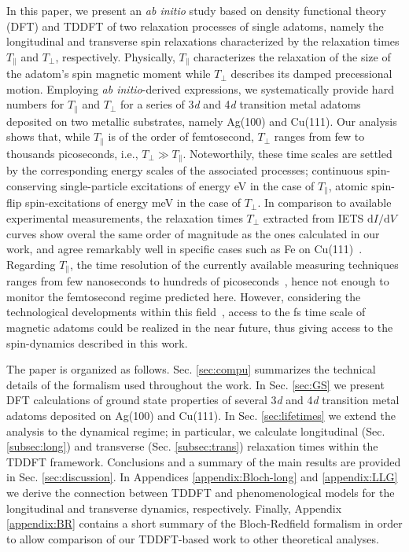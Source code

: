 \documentclass[prb,footinbib,showpacs,twocolumn,amsmath,amssymb]{revtex4}
\begin{document}
In this paper,
we present an \textit{ab initio} study based on density functional theory (DFT) and TDDFT 
of two relaxation processes of
single adatoms, namely the longitudinal and transverse 
spin relaxations characterized by the relaxation times $T_{\parallel}$ and $T_{\perp}$, respectively. 
Physically, 
$T_{\parallel}$ characterizes the relaxation of the size of the adatom's spin magnetic moment
while $T_{\perp}$ describes its damped precessional motion.
Employing \textit{ab initio}-derived expressions, 
we systematically provide hard numbers for $T_{\parallel}$ and $T_{\perp}$ 
for a series of 3\textit{d} and 4\textit{d} transition metal adatoms deposited on two metallic
substrates, namely Ag(100) and Cu(111). 
Our analysis shows that, while $T_{\parallel}$ is of the order of femtosecond, 
$T_{\perp}$ ranges from few to thousands picoseconds, i.e., $T_{\perp}\gg T_{\parallel}$. 
Noteworthily, these time scales are settled by the corresponding energy scales of the
associated processes; continuous spin-conserving single-particle excitations of energy eV
in the case of $T_{\parallel}$, atomic spin-flip spin-excitations of energy meV in the case
of $T_{\perp}$.
In comparison to available experimental measurements, 
the relaxation times $T_{\perp}$ extracted from IETS $\text{d}I/\text{d}V$ curves show overal
the same order of magnitude as the ones calculated in our work, 
and agree remarkably well in
specific cases such as Fe on Cu(111)~\cite{PhysRevLett.106.037205}.
Regarding $T_{\parallel}$, 
the time resolution of the 
currently available measuring techniques  
ranges from few nanoseconds to hundreds of picoseconds~\cite{loth_measurement_2010,saunus_versatile_2013}, 
hence not enough to  
monitor the femtosecond regime predicted here.
However, considering the technological developments within 
this field~\cite{kruger_attosecond_2011,cocker_ultrafast_2013,cocker_tracking_2016}, access to the fs 
time scale of magnetic adatoms could be realized in the near future, thus giving access to the spin-dynamics
described in this work. 





The paper is organized as follows. Sec. \ref{sec:compu} summarizes the technical
details of the formalism used throughout the work. 
In Sec. \ref{sec:GS} we present DFT calculations of ground state properties of
several 3\textit{d} and 4\textit{d} transition metal adatoms deposited on Ag(100) and Cu(111).
In Sec. \ref{sec:lifetimes} we extend the analysis to the dynamical regime; 
in particular, we calculate 
longitudinal (Sec. \ref{subsec:long}) and transverse (Sec. \ref{subsec:trans})
relaxation times within the TDDFT framework. 
Conclusions and a summary  of the main results are provided in Sec. \ref{sec:discussion}. 
In Appendices \ref{appendix:Bloch-long} and  \ref{appendix:LLG}
we derive the connection between TDDFT and phenomenological
models for the longitudinal and transverse dynamics, respectively.
Finally, Appendix \ref{appendix:BR} contains a short summary of the Bloch-Redfield formalism
in order to allow comparison of our TDDFT-based work to 
other theoretical  analyses.
 
\end{document}
